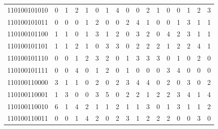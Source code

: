 \documentclass[10pt,a4paper]{article}
\begin{document}
\begin{longtable}{ |c|c|c|c|c|c|c|c|c|c|c|c|c|c|c|c|c| }
    110100101010              & 0                            & 1                                & 2                            & 1                              & 0   & 1   & 4   & 0   & 0   & 2   & 1   & 0   & 0   & 1   & 2   & 3   \\
    110100101011              & 0                            & 0                                & 0                            & 1                              & 2   & 0   & 0   & 2   & 4   & 1   & 0   & 0   & 1   & 3   & 1   & 1   \\
    110100101100              & 1                            & 1                                & 0                            & 1                              & 3   & 1   & 2   & 0   & 3   & 2   & 0   & 4   & 2   & 3   & 1   & 1   \\
    110100101101              & 1                            & 1                                & 2                            & 1                              & 0   & 3   & 3   & 0   & 2   & 2   & 2   & 1   & 2   & 2   & 4   & 1   \\
    110100101110              & 0                            & 0                                & 1                            & 2                              & 3   & 2   & 0   & 1   & 3   & 3   & 3   & 0   & 1   & 0   & 2   & 0   \\
    110100101111              & 0                            & 0                                & 4                            & 0                              & 1   & 2   & 0   & 1   & 0   & 0   & 0   & 3   & 4   & 0   & 0   & 0   \\
    110100110000              & 3                            & 1                                & 1                            & 0                              & 2   & 0   & 2   & 3   & 4   & 4   & 0   & 2   & 0   & 3   & 0   & 2   \\
    110100110001              & 1                            & 3                                & 0                            & 0                              & 3   & 5   & 0   & 2   & 2   & 1   & 2   & 2   & 3   & 4   & 1   & 4   \\
    110100110010              & 6                            & 1                                & 4                            & 2                              & 1   & 1   & 2   & 1   & 1   & 3   & 0   & 1   & 3   & 1   & 1   & 2   \\
    110100110011              & 0                            & 0                                & 1                            & 4                              & 2   & 0   & 2   & 3   & 1   & 2   & 2   & 2   & 0   & 0   & 3   & 0   \\

\end{longtable}
\end{document}
